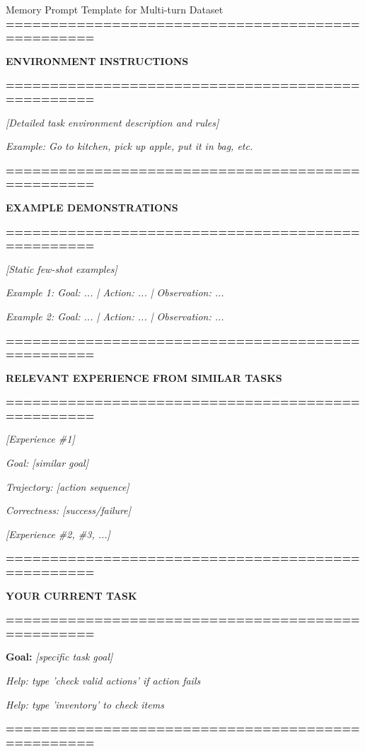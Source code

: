\begin{prompt}{Memory Prompt Template for Multi-turn Dataset}
\small
\textbf{ ==================================================}

\textbf{ENVIRONMENT INSTRUCTIONS}

\textbf{==================================================}

\textit{[Detailed task environment description and rules]}

\textit{Example: Go to kitchen, pick up apple, put it in bag, etc.}

\vspace{12pt}
\textbf{==================================================}

\textbf{EXAMPLE DEMONSTRATIONS}

\textbf{==================================================}

\textit{[Static few-shot examples]}

\textit{Example 1: Goal: ... | Action: ... | Observation: ...}

\textit{Example 2: Goal: ... | Action: ... | Observation: ...}

\vspace{12pt}
\textbf{==================================================}

\textbf{RELEVANT EXPERIENCE FROM SIMILAR TASKS}

\textbf{==================================================}

\textit{[Experience \#1]}

\textit{Goal: [similar goal]}

\textit{Trajectory: [action sequence]}

\textit{Correctness: [success/failure]}

\vspace{6pt}
\textit{[Experience \#2, \#3, ...]}

\vspace{12pt}
\textbf{==================================================}

\textbf{YOUR CURRENT TASK}

\textbf{==================================================}

\textbf{Goal:} \textit{[specific task goal]}

\textit{Help: type 'check valid actions' if action fails}

\textit{Help: type 'inventory' to check items}

\vspace{12pt}
\textbf{==================================================}


\end{prompt}
